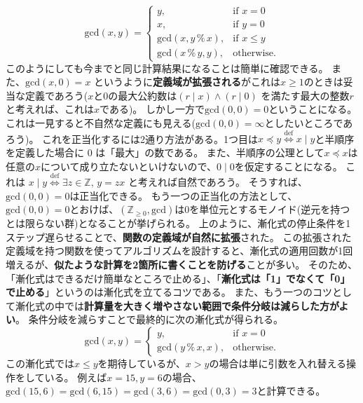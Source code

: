 \documentclass[a4paper,twoside,onecolumn,openany,article,10pt]{memoir}
\theoremstyle{remark}
\begin{document}
\begin{equation}
\mathrm{gcd}(x, y) =
\begin{cases}
y,& \text{if } x = 0\\
x,& \text{if } y = 0\\
\mathrm{gcd}(x, y\, \%\, x),& \text{if } x\le y\\
\mathrm{gcd}(x\, \%\, y, y),& \text{otherwise.}
\end{cases}
\end{equation}
このようにしても今までと同じ計算結果になることは簡単に確認できる。
また、$\mathrm{gcd}(x, 0)=x$ というように\textbf{定義域が拡張される}がこれは$x\ge 1$のときは妥当な定義であろう($x$と0の最大公約数は$(r \mid x)\land (r\mid 0)$
を満たす最大の整数$r$と考えれば、これは$x$である)。
しかし一方で$\mathrm{gcd}(0, 0)=0$ということになる。これは一見すると不自然な定義にも見える($\mathrm{gcd}(0,0)=\infty$としたいところであろう)。
これを正当化するには2通り方法がある。1つ目は$x\preceq y \stackrel{\mathrm{def}}{\iff} x\mid y$と半順序を定義した場合に 0 は「最大」の数である。
また、半順序の公理として$x\preceq x$は任意の$x$について成り立たないといけないので、$0\mid 0$を仮定することになる。
これは $x \mid y\stackrel{\mathrm{def}}{\iff} \exists z\in \mathbb{Z},\, y = zx$ と考えれば自然であろう。
そうすれば、$\mathrm{gcd}(0,0)=0$は正当化できる。
もう一つの正当化の方法として、$\mathrm{gcd}(0,0)=0$とおけば、$(\mathbb{Z}_{\ge 0}, \mathrm{gcd})$は0を単位元とするモノイド(逆元を持つとは限らない群)となることが挙げられる。
上のように、漸化式の停止条件を1ステップ遅らせることで、\textbf{関数の定義域が自然に拡張}された。
この拡張された定義域を持つ関数を使ってアルゴリズムを設計すると、漸化式の適用回数が1回増えるが、\textbf{似たような計算を2箇所に書くことを防げる}ことが多い。
そのため、「漸化式はできるだけ簡単なところで止める」、「\textbf{漸化式は「1」でなくて「0」で止める}」というのは漸化式を立てるコツである。
また、もう一つのコツとして漸化式の中では\textbf{計算量を大きく増やさない範囲で条件分岐は減らした方がよい}。
条件分岐を減らすことで最終的に次の漸化式が得られる。
\begin{equation}
\mathrm{gcd}(x, y) =
\begin{cases}
y,& \text{if } x = 0\\
\mathrm{gcd}(y\, \%\, x, x),& \text{otherwise.}
\end{cases}
\label{eq:gcd4}
\end{equation}
この漸化式では$x\le y$を期待しているが、$x>y$の場合は単に引数を入れ替える操作をしている。
例えば$x=15, y=6$の場合、$\mathrm{gcd}(15, 6) = \mathrm{gcd}(6, 15) = \mathrm{gcd}(3, 6) = \mathrm{gcd}(0, 3) = 3$と計算できる。
\end{document}
